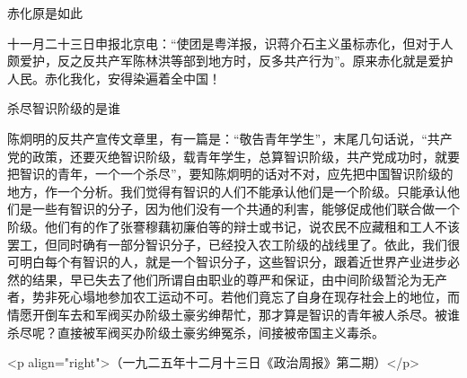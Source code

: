 赤化原是如此

十一月二十三日申报北京电：“使团是粤洋报，识蒋介石主义虽标赤化，但对于人颇爱护，反之反共产军陈林洪等部到地方时，反多共产行为”。原来赤化就是爱护人民。赤化我化，安得染遍着全中国！

杀尽智识阶级的是谁

陈炯明的反共产宣传文章里，有一篇是：“敬告青年学生”，末尾几句话说，“共产党的政策，还要灭绝智识阶级，载青年学生，总算智识阶级，共产党成功时，就要把智识的青年，一个一个杀尽”，要知陈炯明的话对不对，应先把中国智识阶级的地方，作一个分析。我们觉得有智识的人们不能承认他们是一个阶级。只能承认他们是一些有智识的分子，因为他们没有一个共通的利害，能够促成他们联合做一个阶级。他们有的作了张謇穆藕初廉伯等的辩士或书记，说农民不应藏租和工人不该罢工，但同时确有一部分智识分子，已经投入农工阶级的战线里了。依此，我们很可明白每个有智识的人，就是一个智识分子，这些智识分，跟着近世界产业进步必然的结果，早已失去了他们所谓自由职业的尊严和保证，由中间阶级暂沦为无产者，势非死心塌地参加农工运动不可。若他们竟忘了自身在现存社会上的地位，而情愿开倒车去和军阀买办阶级土豪劣绅帮忙，那才算是智识的青年被人杀尽。被谁杀尽呢？直接被军阀买办阶级土豪劣绅冤杀，间接被帝国主义毒杀。

<p align="right">（一九二五年十二月十三日《政治周报》第二期）</p>

